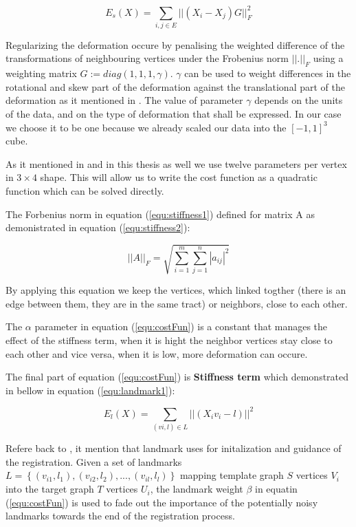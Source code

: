\documentclass[../structure.tex]{subfiles}
\begin{document}
\begin{equation}
E_{s}(X) = \sum_{i,j \in E} ||(X_{i} - X_{j})G||_{F}^2
\label{equ:stiffness1}
\end{equation}

Regularizing the deformation occure by penalising the weighted difference of the transformations of neighbouring vertices under the Frobenius norm $||.||_{F}$ using a weighting matrix $G := diag(1, 1, 1, \gamma)$.
$\gamma$ can be used to weight differences in the rotational and skew part of the deformation against the translational part of the deformation as it mentioned in \cite{Amberg2007}. The value of parameter $\gamma$ depends on the units of the data, and on the type of deformation that shall be expressed. In our case we choose it to be one because we already scaled our data into the $[-1, 1]^3$ cube.

As it mentioned in \cite{Amberg2007} and in this thesis as well we use twelve parameters per vertex in $3 \times 4$ shape. This will allow us to write the cost function as a quadratic function which can be solved directly.

The Forbenius norm in equation (\ref{equ:stiffness1}) defined for matrix A as demonistrated in equation (\ref{equ:stiffness2}):

\begin{equation}
||A||_{F} = \sqrt{\sum_{i=1}^m \sum_{j=1}^n |a_{ij}|^2}
\label{equ:stiffness2}
\end{equation} 

By applying this equation we keep the vertices, which linked togther (there is an edge between them, they are in the same tract) or neighbors, close to each other.

The $\alpha$ parameter in equation (\ref{equ:costFun}) is a constant that manages the effect of the stiffness term, when it is hight the neighbor vertices stay close to each other and vice versa, when it is low, more deformation can occure.

The final part of equation (\ref{equ:costFun}) is \textbf{Stiffness term} which demonstrated in bellow in equation (\ref{equ:landmark1}):

\begin{equation}
E_{l}(X) = \sum_{(vi,l) \in L}||(X_{i}v_{i} - l)||^2
\label{equ:landmark1}
\end{equation}

Refere back to \cite{Amberg2007}, it mention that landmark uses for initalization and guidance of the registration. Given a set of landmarks $L = \left\{(v_{i1},l_{1}),(v_{i2},l_{2}),...,(v_{il},l_{l})\right\}$ mapping template graph $S$ vertices $V_{i}$ into the target graph $T$ vertices $U_{i}$, the landmark weight $\beta$ in equatin (\ref{equ:costFun}) is used to fade out the importance of the potentially noisy landmarks towards the end of the registration process.
\end{document}
